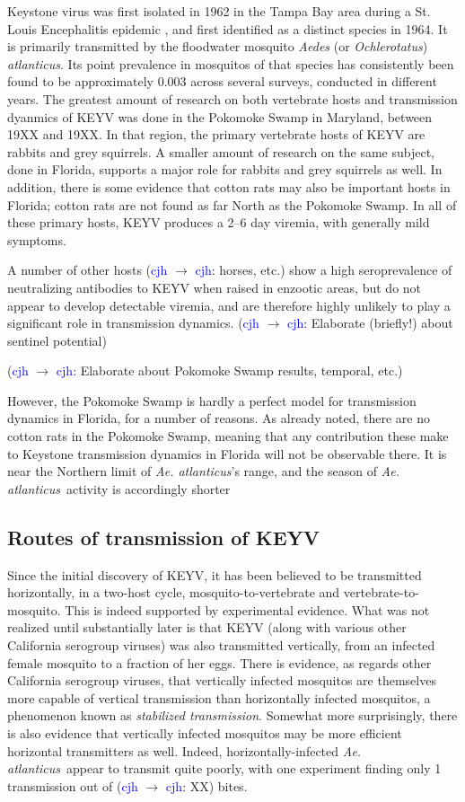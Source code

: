 \documentclass[12pt]{article}
\newcommand{\atl}{\textit{Ae. atlanticus}}
\newcommand{\cjh}{\textcolor{blue}{cjh}}
\newcommand{\msg}[3]{(#1 $\rightarrow$ #2: #3)}
\newcommand{\mcc}[1]{\msg\cjh\cjh{#1}}
\begin{document}
            Keystone virus was first isolated in 1962 in the Tampa Bay area during a St. Louis Encephalitis epidemic \cite{asdf}, and first identified as a distinct species in 1964\cite{bond1966california}. It is primarily transmitted by the floodwater mosquito \textit{Aedes} (or \textit{Ochlerotatus}) \textit{atlanticus}. Its point prevalence in mosquitos of that species has consistently been found to be approximately 0.003 across several surveys, conducted in different years. The greatest amount of research on both vertebrate hosts and transmission dyanmics of KEYV was done in the Pokomoke Swamp in Maryland, between 19XX and 19XX. In that region, the primary vertebrate hosts of KEYV are rabbits and grey squirrels. A smaller amount of research on the same subject, done in Florida, supports a major role for rabbits and grey squirrels as well. In addition, there is some evidence that cotton rats may also be important hosts in Florida\cite{asdf}; cotton rats are not found as far North as the Pokomoke Swamp. In all of these primary hosts, KEYV produces a 2--6 day viremia, with generally mild symptoms.

            A number of other hosts \mcc{horses, etc.} show a high seroprevalence of neutralizing antibodies to KEYV when raised in enzootic areas, but do not appear to develop detectable viremia, and are therefore highly unlikely to play a significant role in transmission dynamics. \mcc{Elaborate (briefly!) about sentinel potential}

            \mcc{Elaborate about Pokomoke Swamp results, temporal, etc.}
            
            However, the Pokomoke Swamp is hardly a perfect model for transmission dynamics in Florida, for a number of reasons. As already noted, there are no cotton rats in the Pokomoke Swamp, meaning that any contribution these make to Keystone transmission dynamics in Florida will not be observable there. It is near the Northern limit of \textit{Ae. atlanticus}'s range, and the season of \atl\ activity is accordingly shorter

        \subsection{Routes of transmission of KEYV}
            \label{transmission-routes}
            Since the initial discovery of KEYV, it has been believed to be transmitted horizontally, in a two-host cycle, mosquito-to-vertebrate and vertebrate-to-mosquito. This is indeed supported by experimental evidence. What was not realized until substantially later is that KEYV (along with various other California serogroup viruses) was also transmitted vertically, from an infected female mosquito to a fraction of her eggs. There is evidence, as regards other California serogroup viruses, that vertically infected mosquitos are themselves more capable of vertical transmission than horizontally infected mosquitos, a phenomenon known as \textit{stabilized transmission}. Somewhat more surprisingly, there is also evidence that vertically infected mosquitos may be more efficient horizontal transmitters as well. Indeed, horizontally-infected \atl\ appear to transmit quite poorly, with one experiment finding only 1 transmission out of \mcc{XX} bites.
\end{document}
